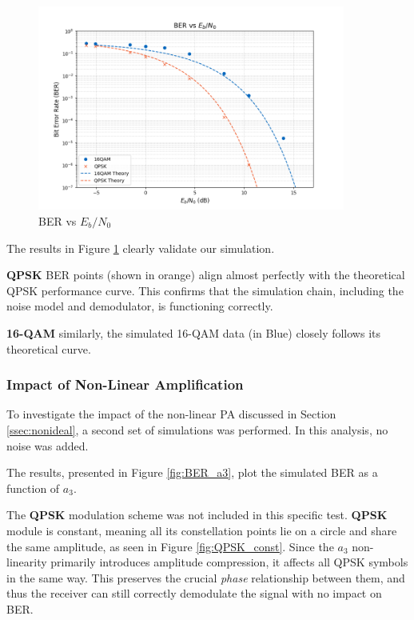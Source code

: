 \begin{figure}[H]
    \centering
    \includegraphics*[width=0.9\textwidth]{Images/BER_SNR_a3_0.png}
    \caption{BER vs $E_b/N_0$}
    \label{fig:BER_SNR_a3_0}
\end{figure}

The results in Figure \ref{fig:BER_SNR_a3_0} clearly validate our simulation.

\textbf{QPSK} BER points (shown in orange) align almost perfectly with the theoretical QPSK performance curve. This confirms that the simulation chain, including the noise model and demodulator, is functioning correctly.

\textbf{16-QAM} similarly, the simulated 16-QAM data (in Blue) closely follows its theoretical curve.

\subsubsection{Impact of Non-Linear Amplification}

To investigate the impact of the non-linear PA discussed in Section \ref{ssec:nonideal}, a second set of simulations was performed. In this analysis, no noise was added.

The results, presented in Figure \ref{fig:BER_a3}, plot the simulated BER as a function of $a_3$.

The \textbf{QPSK} modulation scheme was not included in this specific test. \textbf{QPSK} module is constant, meaning all its constellation points lie on a circle and share the same amplitude, as seen in Figure \ref{fig:QPSK_const}. Since the $a_3$ non-linearity primarily introduces amplitude compression, it affects all QPSK symbols in the same way. This preserves the crucial \emph{phase} relationship between them, and thus the receiver can still correctly demodulate the signal with no impact on BER.

